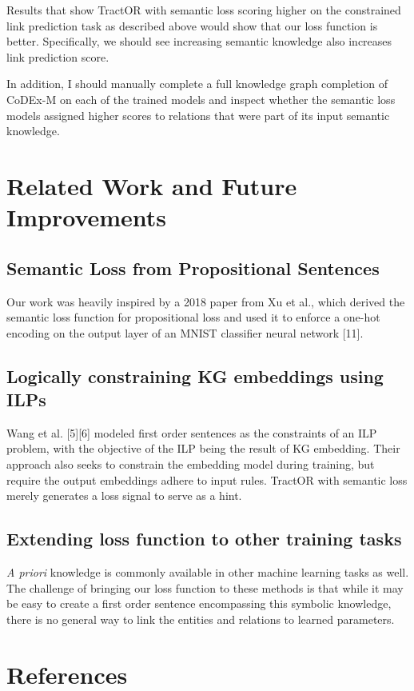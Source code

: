 \documentclass{article}
\begin{document}
Results that show TractOR with semantic loss scoring higher on the constrained
link prediction task as described above would show that our loss function is
better. Specifically, we should see increasing semantic knowledge also increases
link prediction score.

In addition, I should manually complete a full knowledge graph completion of
CoDEx-M on each of the trained models and inspect whether the semantic loss
models assigned higher scores to relations that were part of its input semantic
knowledge.

\section{Related Work and Future Improvements}

\subsection{Semantic Loss from Propositional Sentences}
Our work was heavily inspired by a 2018 paper from Xu et al., which derived the
semantic loss function for propositional loss and used it to enforce a one-hot
encoding on the output layer of an MNIST classifier neural network [11].

\subsection{Logically constraining KG embeddings using ILPs}
Wang et al. [5][6] modeled first order sentences as the constraints of an ILP problem,
with the objective of the ILP being the result of KG embedding. Their approach
also seeks to constrain the embedding model during training, but require the
output embeddings adhere to input rules. TractOR with semantic loss merely
generates a loss signal to serve as a hint. 

\subsection{Extending loss function to other training tasks}
\textit{A priori} knowledge is commonly available in other machine learning
tasks as well. The challenge of bringing our loss function to these methods is
that while it may be easy to create a first order sentence encompassing this
symbolic knowledge, there is no general way to link the entities and relations
to learned parameters.

\section*{References}
\small
\end{document}
